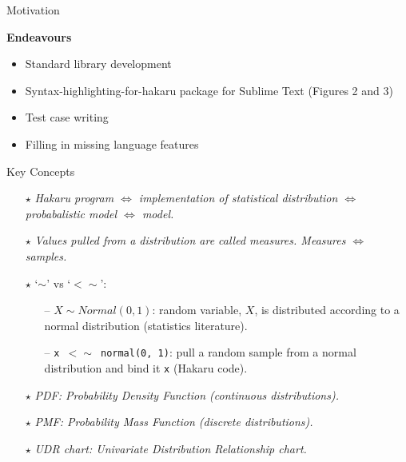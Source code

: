 \documentclass[22pt]{beamer}
\begin{document}
\begin{frame}[fragile]
\begin{textblock}{5}
\begin{block}{\Large{Motivation}}
\justifying

\normalsize{\textbf{Endeavours}}

\footnotesize{
\begin{itemize}
  \item Standard library development
  \item Syntax-highlighting-for-hakaru package for Sublime Text (Figures 2 and 3)
  \item Test case writing
  \item Filling in missing language features
\end{itemize}
        }

\end{block}



\begin{block}{\Large{Key Concepts}}
\justifying

\footnotesize{
\begin{itemize}
  \item[\textbf{$\star$}] \textit{Hakaru program $\Longleftrightarrow$ implementation of statistical distribution $\Longleftrightarrow$ probabalistic model $\Longleftrightarrow$ model.}
  \item[\textbf{$\star$}] \textit{Values pulled from a distribution are called measures. Measures $\Longleftrightarrow$ samples.}
  \item[\textbf{$\star$}] `{\textbf{$\sim$}}' vs `{\textbf{$<\sim$}}':
      \begin{itemize}
          \footnotesize
          \item[--] \footnotesize{$X \sim Normal(0, 1)$: random variable, $X$, is distributed according to a normal distribution (statistics literature).}
          \item[--] \footnotesize{{\tt \footnotesize{x $<\sim$ normal(0, 1)}}: pull a random sample from a normal distribution and bind it {\tt \footnotesize{x}} (Hakaru code).}
      \end{itemize}
  \item[\textbf{$\star$}] \textit{PDF: Probability Density Function (continuous distributions).}
  \item[\textbf{$\star$}] \textit{PMF: Probability Mass Function (discrete distributions).}
  \item[\textbf{$\star$}] \textit{UDR chart: Univariate Distribution Relationship chart.}
\end{itemize}
}
\end{block}



\end{textblock}
\end{frame}
\end{document}
